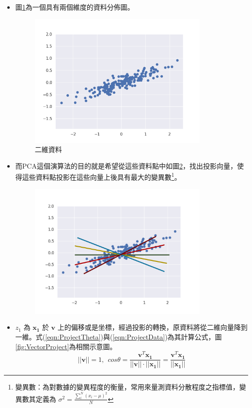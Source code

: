 \begin{itemize}
	\item
	      圖\ref{fig:PcaDemostrate}為一個具有兩個維度的資料分佈圖。


	      \begin{figure}[h]
		      \centering
		      \includegraphics[width=9cm]{pic/pca_demostrate.png}
		      \caption{二維資料}
		      \label{fig:PcaDemostrate}
	      \end{figure}


	      \newpage
		  
	\item
	      而PCA這個演算法的目的就是希望從這些資料點中如圖\ref{fig:PcaVectorToFind}，找出投影向量，使得這些資料點投影在這些向量上後具有最大的變異數\footnote{\noindent 變異數：為對數據的變異程度的衡量，常用來量測資料分散程度之指標值，變異數其定義為 \(\sigma^2=\frac{{}\sum^{N}_{i}(x_i-\mu )^2}{N}\) }。
	      \begin{figure}[h]
		      \centering
		      \includegraphics[width=9cm]{./pic/iVu9zQYG.png}
		      \caption{}
		      \label{fig:PcaVectorToFind}
	      \end{figure}
	\item
		\(z_1\) 為 \(\mathbf{x_1}\) 於 \(\mathbf{v}\) 上的偏移或是坐標，經過投影的轉換，原資料將從二維向量降到一維。式(\ref{eqn:ProjectTheta})與(\ref{eqn:ProjectData})為其計算公式，圖 \ref{fig:VectorProject}為相關示意圖。
		      \begin{equation}
		      \label{eqn:ProjectTheta}
				  ||\mathbf{v}|| = 1, \ \ cos \theta  = \frac{\mathbf{v}^T\mathbf{x_1}}{||\mathbf{v}|| \cdot ||\mathbf{x_1}||}= \frac{\mathbf{v}^T\mathbf{x_1}}{||\mathbf{x_1}||}
		      \end{equation}


\end{itemize}
